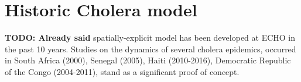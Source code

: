 



\section{Historic Cholera model}
\textbf{TODO: Already said}
spatially-explicit model has been developed at ECHO in the past 10 years\parencite{Bertuzzo:SpacetimeEvolutionCholera:2008}. Studies on the dynamics of several cholera epidemics, occurred in South Africa (2000)\parencite{Mari:ModellingCholeraEpidemics:2012}, Senegal (2005), Haiti (2010-2016)\parencite{Bertuzzo:PredictionSpatialEvolution:2011}, Democratic Republic of the Congo  (2004-2011), stand as a significant proof of concept.  

